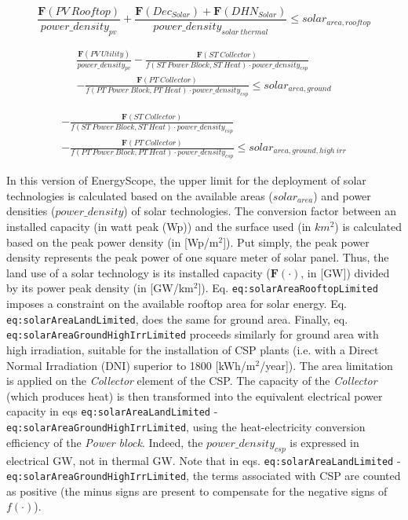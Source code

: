 \documentclass[
]{article}
\begin{document}
{\[\frac{\textbf{F}(PV~Rooftop)}{power\_density_{pv}} + \frac{\textbf{F}(Dec_{Solar}) + \textbf{F}(DHN_{Solar})}{power\_density_{solar~thermal}}  \leq solar_{area,rooftop}\]}

{\[\begin{aligned}
\frac{\textbf{F}(PV~Utility)}{power\_density_{pv}} - \frac{\textbf{F}(ST~Collector)}{f(ST~Power~Block, ST~Heat) \cdot power\_density_{csp}}\\
- \frac{\textbf{F}(PT~Collector)}{f(PT~Power~Block, PT~Heat) \cdot power\_density_{csp}}\leq solar_{area,ground}
\end{aligned}\]}

{\[\begin{aligned}
- \frac{\textbf{F}(ST~Collector)}{f(ST~Power~Block, ST~Heat)\cdot power\_density_{csp}}\\
- \frac{\textbf{F}(PT~Collector)}{f(PT~Power~Block, PT~Heat) \cdot power\_density_{csp}}  \leq solar_{area,ground,high~irr}
\end{aligned}\]}

In this version of EnergyScope, the upper limit for the deployment of
solar technologies is calculated based on the available areas
(\(solar_{area}\)) and power densities (\(power\_density\)) of solar
technologies. The conversion factor between an installed capacity (in
watt peak (Wp)) and the surface used (in \(km^2\)) is calculated based
on the peak power density (in {[}Wp/m\(^2\){]}). Put simply, the peak
power density represents the peak power of one square meter of solar
panel. Thus, the land use of a solar technology is its installed
capacity (\(\textbf{F}(\cdot)\), in {[}GW{]}) divided by its power peak
density (in {[}GW/km\(^2\){]}). Eq. \texttt{eq:solarAreaRooftopLimited}
imposes a constraint on the available rooftop area for solar energy. Eq.
\texttt{eq:solarAreaLandLimited}, does the same for ground area.
Finally, eq. \texttt{eq:solarAreaGroundHighIrrLimited} proceeds
similarly for ground area with high irradiation, suitable for the
installation of CSP plants (i.e. with a Direct Normal Irradiation (DNI)
superior to 1800 {[}kWh/m\(^2\)/year{]}). The area limitation is applied
on the \emph{Collector} element of the CSP. The capacity of the
\emph{Collector} (which produces heat) is then transformed into the
equivalent electrical power capacity in eqs
\texttt{eq:solarAreaLandLimited} -
\texttt{eq:solarAreaGroundHighIrrLimited}, using the heat-electricity
conversion efficiency of the \emph{Power block}. Indeed, the
\(power\_density_{csp}\) is expressed in electrical GW, not in thermal
GW. Note that in eqs. \texttt{eq:solarAreaLandLimited} -
\texttt{eq:solarAreaGroundHighIrrLimited}, the terms associated with CSP
are counted as positive (the minus signs are present to compensate for
the negative signs of \(f(\cdot)\)).
\end{document}
